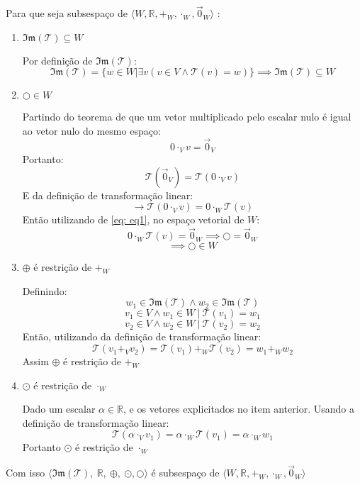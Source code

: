 \documentclass[12pt, twoside, a4]{article} %
\begin{document}
Para que seja subsespaço de $\langle W, \mathbb{R}, +_W, \cdot_W, \overrightarrow{0}_W  \rangle $ :
\begin{enumerate}
    \item $\mathfrak{Im} (\mathcal{T}) \subseteq W $
    
    Por definição de $\mathfrak{Im} (\mathcal{T}) $:
    \[ \mathfrak{Im} (\mathcal{T} ) = \{w \in W | \exists v(v \in V \wedge \mathcal{T} (v) = w)\} \implies \mathfrak{Im} (\mathcal{T}) \subseteq W \]
    \item $ \bigcirc \in W $
    
    Partindo do teorema de que um vetor multiplicado pelo escalar nulo é igual ao vetor nulo do mesmo espaço:
    \[ 0 \cdot_V v = \overrightarrow{0}_V  \label{eq: eq1} \tag{1} \]
    Portanto:
    \[  \mathcal{T}(\overrightarrow{0}_V ) = \mathcal{T}(0 \cdot_V v)\]
    E da definição de transformação linear: 
    \[ \to \mathcal{T}(0 \cdot_V v) = 0 \cdot_W \mathcal{T}(v)\]
    Então utilizando de \ref{eq: eq1}, no espaço vetorial de $W$:
    \[ 0 \cdot_W \mathcal{T}(v) =  \overrightarrow{0}_W \implies \bigcirc = \overrightarrow{0}_W \] 
    \[ \implies \bigcirc \in W \]
    \item $ \oplus $ é restrição de $ +_W $
    
    Definindo:
    \[ w_1 \in \mathfrak{Im}(\mathcal{T}) \wedge w_2 \in \mathfrak{Im}(\mathcal{T}) \]
    \[ v_1 \in V \wedge w_1 \in W \ | \ \mathcal{T}(v_1) = w_1 \]
    \[ v_2 \in V \wedge w_2 \in W \ | \ \mathcal{T}(v_2) = w_2 \]
    Então, utilizando da definição de transformação linear:
    \[ \mathcal{T}( v_1 +_V v_2 ) = \mathcal{T}( v_1 ) +_W \mathcal{T}( v_2) = w_1 +_W w_2 \]
    Assim  $ \oplus $ é restrição de $ +_W $

    \item $ \odot  $  é restrição de $ \cdot_W $
    
    Dado um escalar $ \alpha \in \mathbb{R} $, e os vetores explicitados no item anterior.
    Usando a definição de transformação linear:
    \[  \mathcal{T}(  \alpha \cdot_V v_1 ) = \alpha \cdot_W  \mathcal{T}( v_1 ) = \alpha \cdot_W w_1\]
    Portanto $ \odot  $  é restrição de $ \cdot_W $
    
\end{enumerate}

Com isso $ \langle \mathfrak{Im} (\mathcal{T}),\ \mathbb{R},\ \oplus ,\ \odot, \bigcirc \rangle $ é subsespaço de $\langle W, \mathbb{R}, +_W, \cdot_W, \overrightarrow{0}_W  \rangle $
\end{document}
